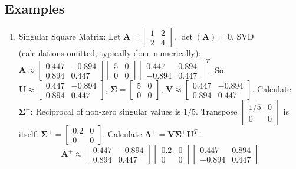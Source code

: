 \documentclass{article}
\newcommand{\mat}[1]{\bm{#1}}  %
\begin{document}
\subsection*{Examples}
\begin{enumerate}
    \item Singular Square Matrix: Let $\mat{A} = \begin{bmatrix} 1 & 2 \\ 2 & 4 \end{bmatrix}$. $\det(\mat{A}) = 0$.
    SVD (calculations omitted, typically done numerically):
    $\mat{A} \approx \begin{bmatrix} 0.447 & -0.894 \\ 0.894 & 0.447 \end{bmatrix} \begin{bmatrix} 5 & 0 \\ 0 & 0 \end{bmatrix} \begin{bmatrix} 0.447 & 0.894 \\ -0.894 & 0.447 \end{bmatrix}^T$.
    So $\mat{U} \approx \begin{bmatrix} 0.447 & -0.894 \\ 0.894 & 0.447 \end{bmatrix}$, $\mat{\Sigma} = \begin{bmatrix} 5 & 0 \\ 0 & 0 \end{bmatrix}$, $\mat{V} \approx \begin{bmatrix} 0.447 & -0.894 \\ 0.894 & 0.447 \end{bmatrix}$.
    Calculate $\mat{\Sigma}^{+}$: Reciprocal of non-zero singular values is $1/5$. Transpose $\begin{bmatrix} 1/5 & 0 \\ 0 & 0 \end{bmatrix}$ is itself. $\mat{\Sigma}^{+} = \begin{bmatrix} 0.2 & 0 \\ 0 & 0 \end{bmatrix}$.
    Calculate $\mat{A}^{+} = \mat{V} \mat{\Sigma}^{+} \mat{U}^T$:
    \[ \mat{A}^{+} \approx \begin{bmatrix} 0.447 & -0.894 \\ 0.894 & 0.447 \end{bmatrix} \begin{bmatrix} 0.2 & 0 \\ 0 & 0 \end{bmatrix} \begin{bmatrix} 0.447 & 0.894 \\ -0.894 & 0.447 \end{bmatrix} \]

\end{enumerate}
\end{document}
